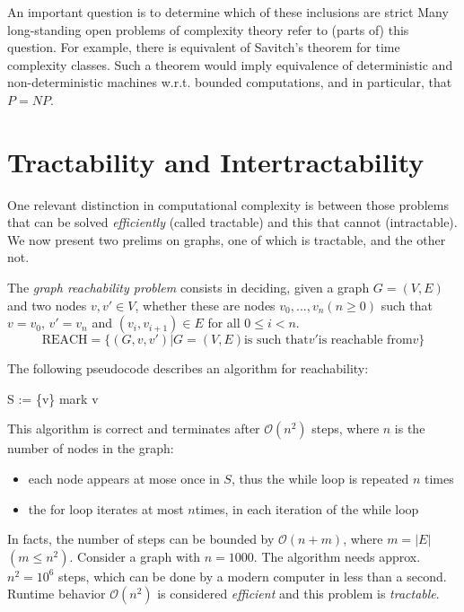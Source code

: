 \documentclass{report}
\begin{document}
An important question is to determine which of these inclusions are strict Many long-standing open problems of complexity theory refer to (parts of) this question. For example, there is equivalent of Savitch's theorem for time complexity classes. Such a theorem would imply equivalence of deterministic and non-deterministic machines w.r.t. bounded computations, and in particular, that $P=NP$.

\chapter{Tractability and Intertractability}
One relevant distinction in computational complexity is between those problems that can be solved \textit{efficiently} (called tractable) and this that cannot (intractable). We  now present two prelims on graphs, one of which is tractable, and the other not.

The \textit{graph reachability problem} consists in deciding, given a graph $G=(V,E)$ and two nodes $v,v' \in V$, whether these are nodes  $v_0,...,v_n (n\geq0)$ such that $v=v_0$, $v'=v_n$ and $(v_i,v_{i+1}) \in E$ for all $0 \leq i < n$.
\[
\text{REACH} = \{ (G,v,v') | G=(V,E) \text{is such that} v' \text{is reachable from} v\}
\]

The following pseudocode describes an algorithm for reachability:
\begin{algorithm}[h]
 S := \{v\}
 mark v\;
\end{algorithm}
This algorithm is correct and terminates after $\mathcal{O}(n^2)$ steps, where $n$ is the number of nodes in the graph:
\begin{itemize}
\item each node appears at mose once in $S$, thus the while loop is repeated $n$ times
\item the for loop iterates at most $n$times, in each iteration of the while loop
\end{itemize}
In facts, the number of steps can be bounded by $\mathcal{O}(n+m)$, where $m=|E|$\quad$(m\leq n^2)$. Consider a graph with  $n=1000$. The algorithm needs approx. $n^2=10^6$ steps, which can be done by a modern computer in less than a second. Runtime behavior $\mathcal{O}(n^2)$ is considered \textit{efficient} and this problem is \textit{tractable}.
\end{document}
